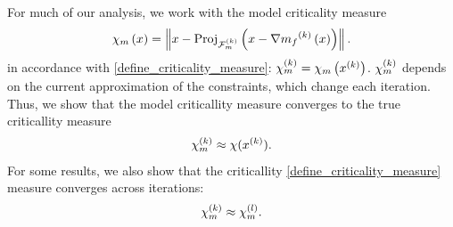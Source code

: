 For much of our analysis, we work with the model criticality measure
\begin{align*}
\chi_m\left(x\right) = \left\|x - \textrm{Proj}_{{\mathcal F_m^{(k)}}}\left(x- \nabla {{m}_f}^{(k)}\left(x\right)\right)\right\|.
\end{align*}
in accordance with \cref{define_criticality_measure}: ${\chi_m^{(k)}} = \chi_m\left(x^{(k)}\right)$.
${\chi_m^{(k)}}$ depends on the current approximation of the constraints, which change each iteration.
Thus, we show that the model criticallity measure converges to the true criticallity measure
\begin{align}
\label{verbiage_hoffman_use_one}
{\chi_m^{(k)}} \approx \chi (x^{(k)}).
\end{align}
For some results, we also show that the criticallity \cref{define_criticality_measure} measure converges across iterations:
\begin{align}
\label{verbiage_hoffman_use_two}
{\chi_m^{(k)}} \approx {\chi_m^{(l)}}.
\end{align}


